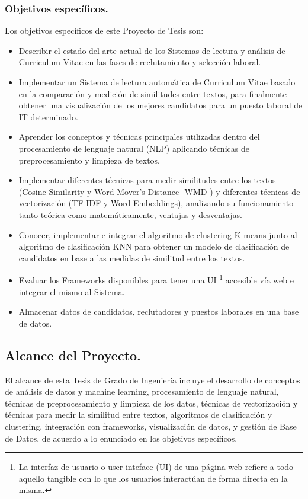 \documentclass[12pt,a4paper]{article}
\begin{document}
\begin{sloppypar}
\subsubsection{Objetivos específicos.}
Los objetivos específicos de este Proyecto de Tesis son:
\begin{itemize}
\item Describir el estado del arte actual de los Sistemas de lectura y análisis de Curriculum Vitae en las fases de reclutamiento y selección laboral. 
\item Implementar un Sistema de lectura automática de Curriculum Vitae basado en la comparación y medición de similitudes entre textos, para finalmente obtener una visualización de los mejores candidatos para un puesto laboral de IT determinado.  
\item Aprender los conceptos y técnicas principales utilizadas dentro del procesamiento de lenguaje natural (NLP) aplicando técnicas de preprocesamiento y limpieza de textos.
\item Implementar diferentes técnicas para medir similitudes entre los textos (Cosine Similarity y  Word Mover's Distance -WMD-) y diferentes técnicas de vectorización (TF-IDF y Word Embeddings), analizando su funcionamiento tanto teórica como matemáticamente, ventajas y desventajas.
\item Conocer, implementar e integrar el algoritmo de clustering K-means junto al algoritmo de clasificación KNN para obtener un modelo de clasificación de candidatos en base a las medidas de similitud entre los textos.
\item Evaluar los Frameworks disponibles para tener una UI \footnote{La interfaz de usuario o user inteface (UI) de una página web refiere a todo aquello tangible con lo que los usuarios interactúan de forma directa en la misma.} accesible vía web e integrar el mismo al Sistema.
\item Almacenar datos de candidatos, reclutadores y puestos laborales en una base de datos.
\end{itemize} 

\cleardoublepage    %

\subsection{Alcance del Proyecto.}
El alcance de esta Tesis de Grado de Ingeniería incluye el desarrollo de conceptos de análisis de datos y machine learning, procesamiento de lenguaje natural, técnicas de preprocesamiento y limpieza de los datos, técnicas de vectorización y técnicas para medir la similitud entre textos, algoritmos de clasificación y clustering, integración con frameworks, visualización de datos, y gestión de Base de Datos, de acuerdo a lo enunciado en los objetivos específicos.


\end{sloppypar}
\end{document}

